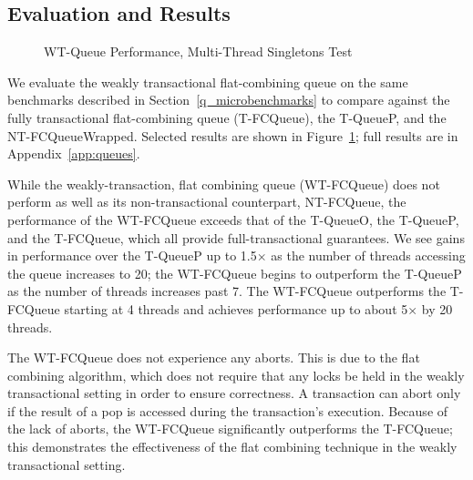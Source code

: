 \subsection{Evaluation and Results}

\begin{figure}[H]
    \centering
    \caption{WT-Queue Performance, Multi-Thread Singletons Test}
    \label{fig:wtqs}
\end{figure}


We evaluate the weakly transactional flat-combining queue on the same benchmarks described in Section~\ref{q_microbenchmarks} to compare against the fully transactional flat-combining queue (T-FCQueue), the T-QueueP, and the NT-FCQueueWrapped. Selected results are shown in Figure~\ref{fig:wtqs}; full results are in Appendix~\ref{app:queues}. 

While the weakly-transaction, flat combining queue (WT-FCQueue) does not perform as well as its non-transactional counterpart, NT-FCQueue, the performance of the WT-FCQueue exceeds that of the T-QueueO, the T-QueueP, and the T-FCQueue, which all provide full-transactional guarantees. We see gains in performance over the T-QueueP up to 1.5$\times$ as the number of threads accessing the queue increases to 20; the WT-FCQueue begins to outperform the T-QueueP as the number of threads increases past 7. The WT-FCQueue outperforms the T-FCQueue starting at 4 threads and achieves performance up to about 5$\times$ by 20 threads.
 
The WT-FCQueue does not experience any aborts. This is due to the flat combining algorithm, which does not require that any locks be held in the weakly transactional setting in order to ensure correctness. A transaction can abort only if the result of a pop is accessed during the transaction's execution.
Because of the lack of aborts, the WT-FCQueue significantly outperforms the T-FCQueue; this demonstrates the effectiveness of the flat combining technique in the weakly transactional setting. 

